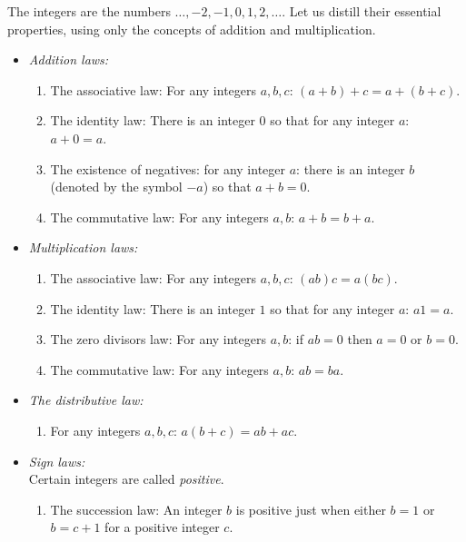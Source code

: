 The integers are the numbers \(\dots, -2, -1, 0, 1, 2, \dots\).
Let us distill their essential properties, using only the concepts of addition and multiplication.
\smallskip
\begin{itemize}
\item[]\emph{Addition laws:}
\begin{enumerate}
\item The associative law: For any integers \(a, b, c\): \((a+b)+c=a+(b+c)\).
\item The identity law: There is an integer \(0\) so that for any integer \(a\): \(a+0=a\).
\item The existence of negatives: for any integer \(a\): there is an integer \(b\) (denoted by the symbol \(-a\)) so that \(a+b=0\).
\item The commutative law: For any integers \(a, b\): \(a+b=b+a\).
\end{enumerate}
\smallskip
\item[]\emph{Multiplication laws:}
\begin{enumerate}
\item The associative law: For any integers \(a, b, c\): \((ab)c=a(bc)\).
\item The identity law: There is an integer \(1\) so that for any integer \(a\): \(a1=a\).
\item The zero divisors law: For any integers \(a,b\): if \(ab=0\) then \(a=0\) or \(b=0\).
\item The commutative law: For any integers \(a, b\): \(ab=ba\).
\end{enumerate}
\smallskip
\item[]\emph{The distributive law:}
\begin{enumerate}
\item For any integers \(a, b, c\): \(a(b+c)=ab+ac\).
\end{enumerate}
\smallskip
\item[]\emph{Sign laws:} \smallskip \\ 
Certain integers are called \emph{positive}.
\begin{enumerate}
\item The succession law: An integer \(b\) is positive just when either \(b=1\) or \(b=c+1\) for a positive integer \(c\).

\end{enumerate}
\end{itemize}
